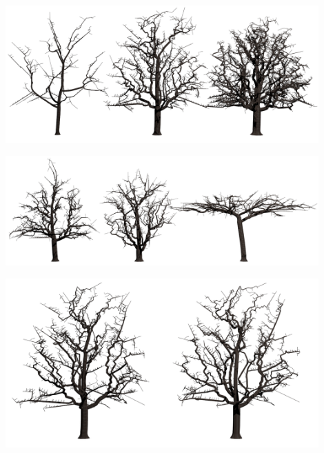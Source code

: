 \begin{center}
	\includegraphics[width=120mm]{images/renders/points.png}
\end{center}

\begin{center}
	\includegraphics[width=120mm]{images/renders/shape.png}
\end{center}

\begin{center}
	\includegraphics[width=120mm]{images/renders/smooth.png}
\end{center}


